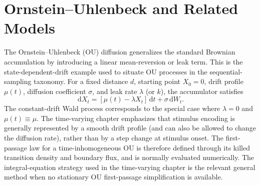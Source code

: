\documentclass[12pt]{article}
\newcommand{\dd}{\,\mathrm{d}}
\begin{document}
\section{Ornstein--Uhlenbeck and Related Models}
The Ornstein--Uhlenbeck (OU) diffusion generalizes the standard Brownian accumulation by introducing a linear mean-reversion or leak term. This is the state-dependent-drift example used to situate OU processes in the sequential- sampling taxonomy. For a fixed distance $d$, starting point $X_0 = 0$, drift profile $\mu(t)$, diffusion coefficient $\sigma$, and leak rate $\lambda$ (or $k$), the accumulator satisfies
\begin{equation}
  \dd X_t = \left[\mu(t) - \lambda X_t\right] \dd t + \sigma \dd W_t.
\end{equation}
The constant-drift Wald process corresponds to the special case where $\lambda=0$ and $\mu(t)\equiv\mu$. The time-varying chapter emphasizes that stimulus encoding is generally represented by a smooth drift profile (and can also be allowed to change the diffusion rate), rather than by a step change at stimulus onset. The first-passage law for a time-inhomogeneous OU is therefore defined through its killed transition density and boundary flux, and is normally evaluated numerically. The integral-equation strategy used in the time-varying chapter is the relevant general method when no stationary OU first-passage simplification is available.
\end{document}
